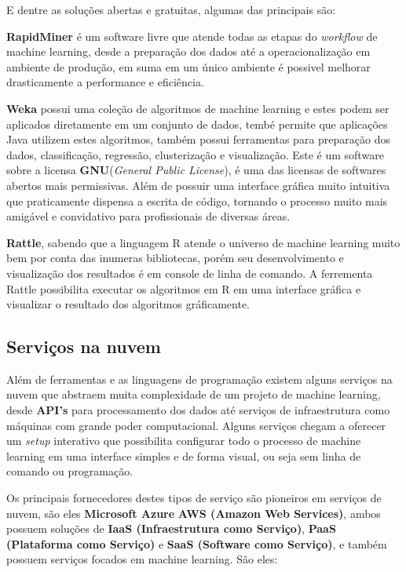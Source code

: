 E dentre as soluções abertas e gratuitas, algumas das principais são:

\begin{alineas}
	\item \textbf{RapidMiner} é um software livre que atende todas as etapas do \textit{workflow} de machine learning, desde a preparação dos dados até 
	a operacionalização em ambiente de produção, em suma em um único ambiente é possivel melhorar drasticamente a performance e eficiência.

	\item \textbf{Weka} possui uma coleção de algoritmos de machine learning e estes podem ser aplicados diretamente em um conjunto de dados, tembé permite
	que aplicações Java utilizem estes algoritmos, também possui ferramentas para preparação dos dados, classificação, regressão, clusterização e visualização.
	Este é um software sobre a licensa \textbf{GNU}(\textit{General Public License}), é uma das licensas de softwares abertos mais permissivas. 
	Além de possuir uma interface gráfica muito intuitiva que praticamente dispensa a escrita de código, tornando o processo muito mais amigável e
	convidativo para profissionais de diversas áreas.

	\item \textbf{Rattle}, sabendo que a linguagem R atende o universo de machine learning muito bem por conta das inumeras bibliotecas, porém 
	seu desenvolvimento e visualização dos resultados é em console de linha de comando. A ferrementa Rattle possibilita executar os algoritmos
	em R em uma interface gráfica e visualizar o resultado dos algoritmos gráficamente.	  
\end{alineas}


\subsection{Serviços na nuvem}
\label{subsec:servicos}
Além de ferramentas e as linguagens de programação existem alguns serviços na nuvem que abstraem muita complexidade de um projeto de machine learning, 
desde \textbf{API's} para processamento dos dados até serviços de infraestrutura como máquinas com grande poder computacional.
Alguns serviços chegam a oferecer um \textit{setup} interativo que possibilita configurar todo o processo de machine learning em uma interface
simples e de forma visual, ou seja sem linha de comando ou programação.


Os principais fornecedores destes tipos de serviço são pioneiros em serviços de nuvem, são eles \textbf{Microsoft Azure} \textbf{AWS (Amazon Web Services)}, 
ambos possuem soluções de \textbf{IaaS (Infraestrutura como Serviço)}, \textbf{PaaS (Plataforma como Serviço)} e \textbf{SaaS (Software como Serviço)}, e também
possuem serviços focados em machine learning. São eles:

